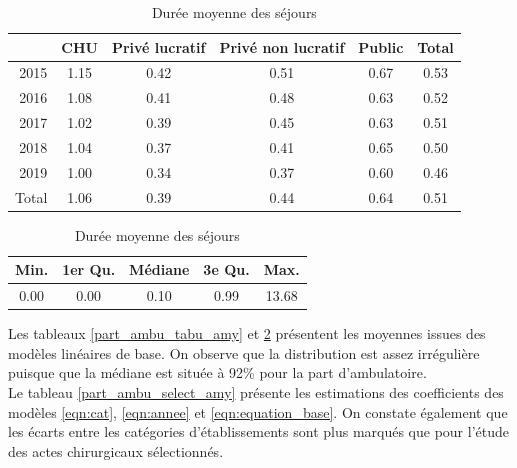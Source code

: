 \begin{table}[!ht]
\centering
\caption{Durée moyenne des séjours} 
\label{dms_tabu_amy}
\begin{tabular}{r|cccc|c}
  \hline
 & CHU & Privé lucratif & Privé non lucratif & Public & Total \\ 
  \hline
2015 & 1.15 & 0.42 & 0.51 & 0.67 & 0.53 \\ 
  2016 & 1.08 & 0.41 & 0.48 & 0.63 & 0.52 \\ 
  2017 & 1.02 & 0.39 & 0.45 & 0.63 & 0.51 \\ 
  2018 & 1.04 & 0.37 & 0.41 & 0.65 & 0.50 \\ 
  2019 & 1.00 & 0.34 & 0.37 & 0.60 & 0.46 \\
  \hline
  Total & 1.06 & 0.39 & 0.44 & 0.64 & 0.51 \\ 
   \hline
\end{tabular}

\bigskip

\begin{tabular}{ccccc}
  \hline
Min. & 1er Qu. & Médiane & 3e Qu. & Max. \\ 
  \hline
0.00 & 0.00 & 0.10 & 0.99 & 13.68 \\ 
   \hline
\end{tabular}
\end{table}

Les tableaux \ref{part_ambu_tabu_amy} et \ref{dms_tabu_amy} présentent les moyennes issues des modèles linéaires de base. On observe que la distribution est assez irrégulière puisque que la médiane est située à 92\% pour la part d'ambulatoire.\\

Le tableau \ref{part_ambu_select_amy} présente les estimations des coefficients des modèles \ref{eqn:cat}, \ref{eqn:annee} et \ref{eqn:equation_base}. On constate également que les écarts entre les catégories d'établissements sont plus marqués que pour l'étude des actes chirurgicaux sélectionnés.

